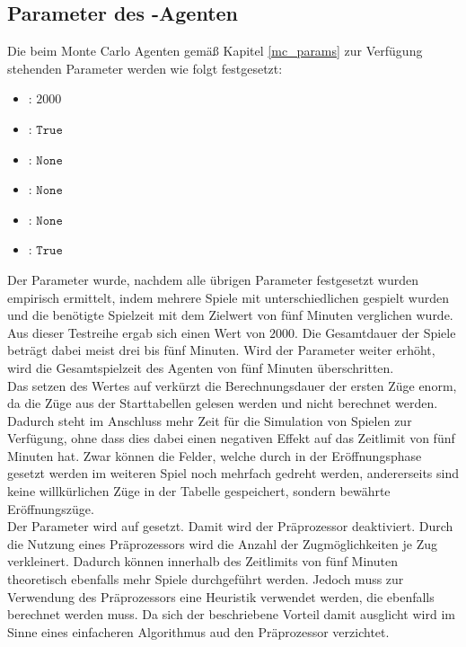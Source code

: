 \subsection{Parameter des -Agenten}
\label{eval:agents:params:subsec-mc}
Die beim Monte Carlo Agenten gemäß Kapitel \ref{mc_params} zur Verfügung stehenden Parameter werden wie folgt festgesetzt:
\begin{itemize}
\item {}: $2000$
\item {}: $\mathtt{True}$
\item {}: $\mathtt{None}$
\item {}: $\mathtt{None}$
\item {}: $\mathtt{None}$
\item {}: $\mathtt{True}$
\end{itemize}
Der Parameter  wurde, nachdem alle übrigen Parameter festgesetzt wurden  empirisch ermittelt, indem mehrere Spiele mit unterschiedlichen  gespielt wurden und die benötigte Spielzeit mit dem Zielwert von fünf Minuten verglichen wurde. Aus dieser Testreihe ergab sich einen  Wert von $2000$. Die Gesamtdauer der Spiele beträgt dabei meist drei bis fünf Minuten. Wird der Parameter weiter erhöht, wird die Gesamtspielzeit des Agenten von fünf Minuten überschritten.
\\Das setzen des Wertes auf  verkürzt die Berechnungsdauer der ersten Züge enorm, da die Züge aus der Starttabellen gelesen werden und nicht berechnet werden. Dadurch steht im Anschluss mehr Zeit für die Simulation von Spielen zur Verfügung, ohne dass dies dabei einen negativen Effekt auf das Zeitlimit von fünf Minuten hat. Zwar können die Felder, welche durch in der Eröffnungsphase gesetzt werden im weiteren Spiel noch mehrfach gedreht werden, andererseits sind keine willkürlichen Züge in der Tabelle gespeichert, sondern bewährte Eröffnungszüge.
\\Der Parameter  wird auf  gesetzt. Damit wird der Präprozessor deaktiviert. Durch die Nutzung eines Präprozessors wird die Anzahl der Zugmöglichkeiten je Zug verkleinert. Dadurch können innerhalb des Zeitlimits von fünf Minuten theoretisch ebenfalls mehr Spiele durchgeführt werden. Jedoch muss zur Verwendung des Präprozessors eine Heuristik verwendet werden, die ebenfalls berechnet werden muss. Da sich der beschriebene Vorteil damit ausglicht wird im Sinne eines einfacheren Algorithmus aud den Präprozessor verzichtet.
